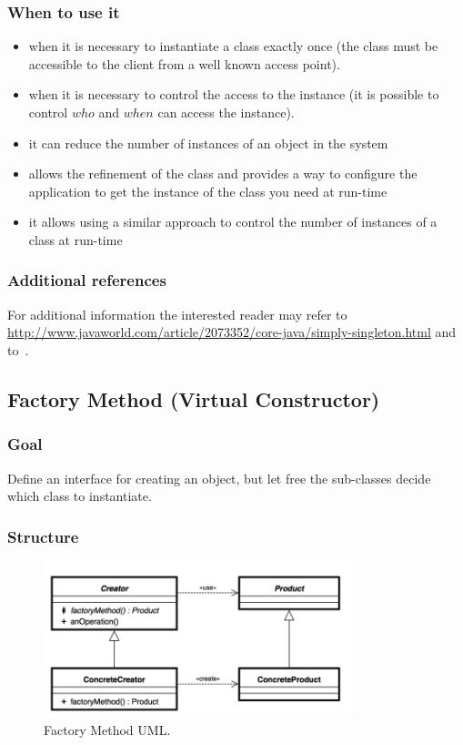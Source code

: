 \documentclass{article}
\begin{document}
\subsubsection{When to use it}
\begin{itemize}
\item when it is necessary to instantiate  a class exactly once (the class must be accessible to the client from a well known access point).
\item when it is necessary to control the access to the instance (it is possible to control $who$ and $when$ can access the instance).
\item it can reduce the number of instances of an object in the system
\item allows the refinement of the class and provides a way to configure the application to get the instance of the class you need at run-time
\item it allows using a similar approach to control the number of instances of a class at run-time
\end{itemize}

\subsubsection{Additional references}
For additional information the interested reader may refer to \url{http://www.javaworld.com/article/2073352/core-java/simply-singleton.html} and to~\cite{gamma1994design}.


\subsection{Factory Method (Virtual Constructor)}
\subsubsection{Goal}
Define an interface for creating an object, but let free the sub-classes decide which class to instantiate.

\subsubsection{Structure}

\begin{figure}[h!]
  \centering
    \includegraphics[width=0.8\textwidth]{Img/FactoryMethod.png}
     \caption{Factory Method UML.}
     \label{FactoryMethod}
\end{figure}
\end{document}
